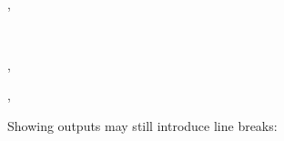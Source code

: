 \documentclass[a4paper]{article}
\begin{document}
\begin{alectryon}
\begin{sentence}
\begin{input}
      \nl
      ~~~~~~~~~\nl
      ~~~~~~~
    \end{input}
  \end{sentence}
  \sep
  \begin{sentence}
    \begin{input}
      ~~
    \end{input}
  \end{sentence}
  \sep
  \begin{sentence}
    \begin{input}
      \nl
    \end{input}
  \end{sentence}
  \sep
  \begin{sentence}
    \begin{input}
    \end{input}
  \end{sentence}
\end{alectryon}

Showing outputs may still introduce line breaks:
\end{document}
